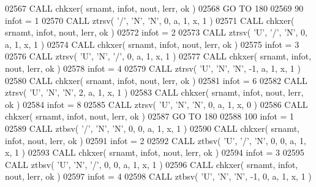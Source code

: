 \begin{DoxyCode}
02567       \textcolor{keyword}{CALL }chkxer( srnamt, infot, nout, lerr, ok )
02568       \textcolor{keywordflow}{GO TO} 180
02569    90 infot = 1
02570       \textcolor{keyword}{CALL }ztrsv( \textcolor{stringliteral}{'/'}, \textcolor{stringliteral}{'N'}, \textcolor{stringliteral}{'N'}, 0, a, 1, x, 1 )
02571       \textcolor{keyword}{CALL }chkxer( srnamt, infot, nout, lerr, ok )
02572       infot = 2
02573       \textcolor{keyword}{CALL }ztrsv( \textcolor{stringliteral}{'U'}, \textcolor{stringliteral}{'/'}, \textcolor{stringliteral}{'N'}, 0, a, 1, x, 1 )
02574       \textcolor{keyword}{CALL }chkxer( srnamt, infot, nout, lerr, ok )
02575       infot = 3
02576       \textcolor{keyword}{CALL }ztrsv( \textcolor{stringliteral}{'U'}, \textcolor{stringliteral}{'N'}, \textcolor{stringliteral}{'/'}, 0, a, 1, x, 1 )
02577       \textcolor{keyword}{CALL }chkxer( srnamt, infot, nout, lerr, ok )
02578       infot = 4
02579       \textcolor{keyword}{CALL }ztrsv( \textcolor{stringliteral}{'U'}, \textcolor{stringliteral}{'N'}, \textcolor{stringliteral}{'N'}, -1, a, 1, x, 1 )
02580       \textcolor{keyword}{CALL }chkxer( srnamt, infot, nout, lerr, ok )
02581       infot = 6
02582       \textcolor{keyword}{CALL }ztrsv( \textcolor{stringliteral}{'U'}, \textcolor{stringliteral}{'N'}, \textcolor{stringliteral}{'N'}, 2, a, 1, x, 1 )
02583       \textcolor{keyword}{CALL }chkxer( srnamt, infot, nout, lerr, ok )
02584       infot = 8
02585       \textcolor{keyword}{CALL }ztrsv( \textcolor{stringliteral}{'U'}, \textcolor{stringliteral}{'N'}, \textcolor{stringliteral}{'N'}, 0, a, 1, x, 0 )
02586       \textcolor{keyword}{CALL }chkxer( srnamt, infot, nout, lerr, ok )
02587       \textcolor{keywordflow}{GO TO} 180
02588   100 infot = 1
02589       \textcolor{keyword}{CALL }ztbsv( \textcolor{stringliteral}{'/'}, \textcolor{stringliteral}{'N'}, \textcolor{stringliteral}{'N'}, 0, 0, a, 1, x, 1 )
02590       \textcolor{keyword}{CALL }chkxer( srnamt, infot, nout, lerr, ok )
02591       infot = 2
02592       \textcolor{keyword}{CALL }ztbsv( \textcolor{stringliteral}{'U'}, \textcolor{stringliteral}{'/'}, \textcolor{stringliteral}{'N'}, 0, 0, a, 1, x, 1 )
02593       \textcolor{keyword}{CALL }chkxer( srnamt, infot, nout, lerr, ok )
02594       infot = 3
02595       \textcolor{keyword}{CALL }ztbsv( \textcolor{stringliteral}{'U'}, \textcolor{stringliteral}{'N'}, \textcolor{stringliteral}{'/'}, 0, 0, a, 1, x, 1 )
02596       \textcolor{keyword}{CALL }chkxer( srnamt, infot, nout, lerr, ok )
02597       infot = 4
02598       \textcolor{keyword}{CALL }ztbsv( \textcolor{stringliteral}{'U'}, \textcolor{stringliteral}{'N'}, \textcolor{stringliteral}{'N'}, -1, 0, a, 1, x, 1 )

\end{DoxyCode}
